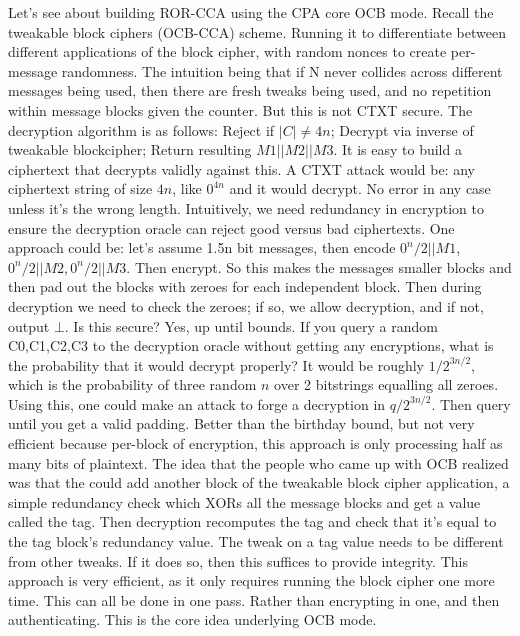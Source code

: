 Let's see about building ROR-CCA using the CPA core OCB mode.
Recall the tweakable block ciphers (OCB-CCA) scheme. Running it to differentiate between different applications of the block cipher, with random nonces to create per-message randomness. The intuition being that if N never collides across different messages being used, then there are fresh tweaks being used, and no repetition within message blocks given the counter. But this is not CTXT secure. The decryption algorithm is as follows:
Reject if $|C|\neq 4n$; Decrypt via inverse of tweakable blockcipher; Return resulting $M1||M2||M3$. It is easy to build a ciphertext that decrypts validly against this. A CTXT attack would be: any ciphertext string of size $4n$, like $0^{4n}$ and it would decrypt. No error in any case unless it's the wrong length. Intuitively, we need redundancy in encryption to ensure the decryption oracle can reject good versus bad ciphertexts. One approach could be: let's assume 1.5n bit messages, then encode $0^n / 2 || M1$, $0^n / 2 || M2, 0^n / 2 || M3$. Then encrypt. So this makes the messages smaller blocks and then pad out the blocks with zeroes for each independent block. Then during decryption we need to check the zeroes; if so, we allow decryption, and if not, output $\bot$. Is this secure? Yes, up until bounds. If you query a random C0,C1,C2,C3 to the decryption oracle without getting any encryptions, what is the probability that it would decrypt properly? It would be roughly $1/ 2^{3n/2}$, which is the probability of three random $n$ over 2 bitstrings equalling all zeroes. Using this, one could make an attack to forge a decryption in $q / 2^{3n/2}$. Then query until you get a valid padding. Better than the birthday bound, but not very efficient because per-block of encryption, this approach is only processing half as many bits of plaintext.
The idea that the people who came up with OCB realized was that the could add another block of the tweakable block cipher application, a simple redundancy check which XORs all the message blocks and get a value called the tag. Then decryption recomputes the tag and check that it's equal to the tag block's redundancy value. The tweak on a tag value needs to be different from other tweaks. If it does so, then this suffices to provide integrity. This approach is very efficient, as it only requires running the block cipher one more time. This can all be done in one pass. Rather than encrypting in one, and then authenticating. This is the core idea underlying OCB mode.
